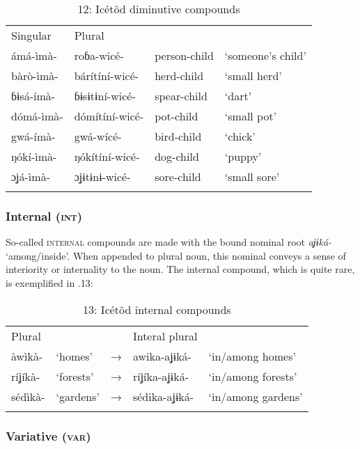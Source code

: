\begin{table}
\caption{12: Icétôd diminutive compounds}
\label{tab:4}


\begin{tabularx}{\textwidth}{XXXX}
\lsptoprule

Singular & Plural &  & \\
ámá-ìmà- & roɓa-wicé- & person-child & ‘someone’s child’\\
bàrò-ìmà- & bárítíní-wicé- & herd-child & ‘small herd’\\
ɓɨsá-ímà- & ɓɨsɨtɨní-wicé- & spear-child & ‘dart’\\
dómá-ìmà- & dómítíní-wicé- & pot-child & ‘small pot’\\
gwá-ímà- & gwá-wícé- & bird-child & ‘chick’\\
ŋókí-ìmà- & ŋókítíní-wicé- & dog-child & ‘puppy’\\
ɔʝá-ìmà- & ɔʝɨtɨnɨ-wicé- & sore-child & ‘small sore’\\
\lspbottomrule
\end{tabularx}
\end{table}

\subsubsection{Internal (\textsc{int})}

So-called \textsc{internal} compounds are made with the bound nominal root \textit{aʝɨká-} ‘among/inside’. When appended to plural noun, this nominal conveys a sense of interiority or internality to the noun. The internal compound, which is quite rare, is exemplified in .13:


\begin{table}
\caption{13: Icétôd internal compounds}
\label{tab:4}


\begin{tabularx}{\textwidth}{XXXXX}
\lsptoprule

Plural &  &  & Interal plural & \\
àwìkà- & ‘homes’ & → & awika-aʝɨká- & ‘in/among homes’\\
ríʝíkà- & ‘forests’ & → & ríʝíka-aʝɨká- & ‘in/among forests’\\
sédìkà- & ‘gardens’ & → & sédika-aʝɨká- & ‘in/among gardens’\\
\lspbottomrule
\end{tabularx}
\end{table}

\subsubsection{Variative (\textsc{var})}

